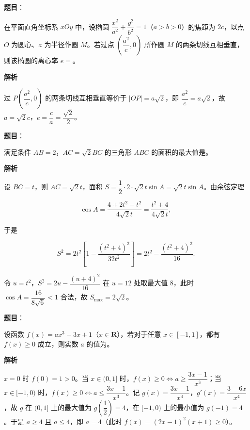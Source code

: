 \begin{answer}

\textbf{题目}：

在平面直角坐标系 $xOy$ 中，设椭圆 $\dfrac{x^2}{a^2}+\dfrac{y^2}{b^2}=1$（$a>b>0$）的焦距为 $2c$，以点 $O$ 为圆心、$a$ 为半径作圆 $M$。若过点 $\left(\dfrac{a^2}{c},0\right)$ 所作圆 $M$ 的两条切线互相垂直，则该椭圆的离心率 $e=$\gkblank{}。

\textbf{解析}

过 $P\left(\dfrac{a^2}c,0\right)$ 的两条切线互相垂直等价于 $|OP|=a\sqrt2$，即 $\dfrac{a^2}c=a\sqrt2$，故 $a=\sqrt2c$，$e=\dfrac ca=\dfrac{\sqrt2}2$。


\end{answer}
\begin{answer}

\textbf{题目}：

满足条件 $AB=2$，$AC=\sqrt2BC$ 的三角形 $ABC$ 的面积的最大值是\gkblank{}。

\textbf{解析}

设 $BC=t$，则 $AC=\sqrt2t$，面积 $S=\dfrac12\cdot2\cdot\sqrt2t\sin A=\sqrt2t\sin A$。由余弦定理

\nopagebreak[4]
\[\cos A=\frac{4+2t^2-t^2}{4\sqrt2t}=\frac{t^2+4}{4\sqrt2t},\]

于是

\nopagebreak[4]
\[S^2=2t^2\left[1-\frac{(t^2+4)^2}{32t^2}\right]=2t^2-\frac{(t^2+4)^2}{16}.\]

令 $u=t^2$，$S^2=2u-\dfrac{(u+4)^2}{16}$ 在 $u=12$ 处取最大值 $8$，此时 $\cos A=\dfrac{16}{8\sqrt6}<1$ 合法，故 $S_{\max}=2\sqrt2$。


\end{answer}
\begin{answer}

\textbf{题目}：

设函数 $f(x)=ax^3-3x+1$（$x\in\mathbf R$），若对于任意 $x\in[-1,1]$，都有 $f(x)\geqslant0$ 成立，则实数 $a$ 的值为\gkblank{}。

\textbf{解析}

$x=0$ 时 $f(0)=1>0$。当 $x\in(0,1]$ 时，$f(x)\geqslant0\iff a\geqslant\dfrac{3x-1}{x^3}$；当 $x\in[-1,0)$ 时，$f(x)\geqslant0\iff a\leqslant\dfrac{3x-1}{x^3}$。记 $g(x)=\dfrac{3x-1}{x^3}$，$g'(x)=\dfrac{3-6x}{x^4}$，故 $g$ 在 $(0,1]$ 上的最大值为 $g\left(\dfrac12\right)=4$，在 $[-1,0)$ 上的最小值为 $g(-1)=4$。于是 $a\geqslant4$ 且 $a\leqslant4$，即 $a=4$（此时 $f(x)=(2x-1)^2(x+1)\geqslant0$）。


\end{answer}

